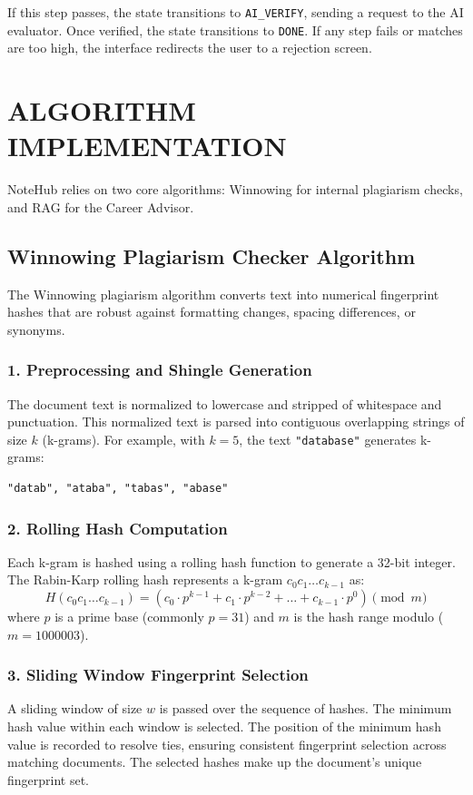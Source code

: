 \documentclass[12,Times new Roman,a4paper]{report}
\begin{document}
If this step passes, the state transitions to \texttt{AI\_VERIFY}, sending a request to the AI evaluator. Once verified, the state transitions to \texttt{DONE}. If any step fails or matches are too high, the interface redirects the user to a rejection screen.

\newpage
\section{ALGORITHM IMPLEMENTATION}

NoteHub relies on two core algorithms: Winnowing for internal plagiarism checks, and RAG for the Career Advisor.

\subsection{Winnowing Plagiarism Checker Algorithm}

The Winnowing plagiarism algorithm converts text into numerical fingerprint hashes that are robust against formatting changes, spacing differences, or synonyms.

\subsubsection*{1. Preprocessing and Shingle Generation}
The document text is normalized to lowercase and stripped of whitespace and punctuation. This normalized text is parsed into contiguous overlapping strings of size $k$ (k-grams). For example, with $k=5$, the text \texttt{"database"} generates k-grams:
\begin{verbatim}
"datab", "ataba", "tabas", "abase"
\end{verbatim}

\subsubsection*{2. Rolling Hash Computation}
Each k-gram is hashed using a rolling hash function to generate a 32-bit integer. The Rabin-Karp rolling hash represents a k-gram $c_0 c_1 \dots c_{k-1}$ as:
\begin{equation}
H(c_0 c_1 \dots c_{k-1}) = \left( c_0 \cdot p^{k-1} + c_1 \cdot p^{k-2} + \dots + c_{k-1} \cdot p^0 \right) \pmod m
\end{equation}
where $p$ is a prime base (commonly $p=31$) and $m$ is the hash range modulo ($m=1000003$).

\subsubsection*{3. Sliding Window Fingerprint Selection}
A sliding window of size $w$ is passed over the sequence of hashes. The minimum hash value within each window is selected. The position of the minimum hash value is recorded to resolve ties, ensuring consistent fingerprint selection across matching documents. The selected hashes make up the document's unique fingerprint set.
\end{document}

